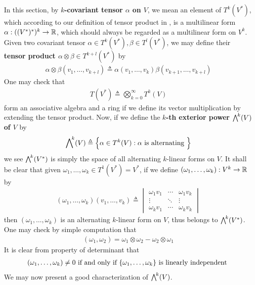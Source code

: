 \documentclass{report}
\begin{document}
\begin{mdframed}
  In this section, by \textbf{$k$-covariant tensor $\alpha $ on $V$}, we mean an element of $T^k(V^*)$, which according to our definition of tensor product in , is a multilinear form $\alpha : ((V^*)^*)^k\rightarrow \mathbb{R}$, which should always be regarded as a multilinear form on $V^k$. Given two covariant tensor $\alpha \in T^k(V^*),\beta \in T^l(V^*)$, we may define their \textbf{tensor product $\alpha \otimes  \beta \in T^{k+l}(V^*)$} by 
\begin{align*}
\alpha \otimes  \beta (v_1,\dots ,v_{k+l})\triangleq \alpha (v_1,\dots ,v_k)\beta (v_{k+1},\dots ,v_{k+l})
\end{align*}
One may check that 
\begin{align*}
T(V^*)\triangleq  \bigotimes_{k=0}^{\infty} T^k(V)
\end{align*}
form an associative algebra and a ring if we define its vector multiplication by extending the tensor product. Now, if we define the  \textbf{$k$-th exterior power $\extp^k(V)$ of $V$} by
\begin{align*}
\extp^k(V)\triangleq \bset{\alpha \in T^k(V):\alpha \text{ is alternating }}
\end{align*}
we see $\extp^k(V^*)$ is simply the space of all alternating $k$-linear forms on  $V$. It shall be clear that given $\omega_1,\dots ,\omega_k \in T^1(V^*)=V^*$, if we define $(\omega_1,\dots ,\omega_k):V^k\rightarrow \mathbb{R}$ by 
\begin{align*}
  (\omega_1,\dots ,\omega_k)(v_1,\dots ,v_k)\triangleq  \begin{vmatrix}
      \omega_1 v_1 & \cdots & \omega_1 v_k \\
      \vdots & \ddots & \vdots \\
      \omega_k v_1 & \cdots & \omega_k v_k
  \end{vmatrix} 
\end{align*}
then $(\omega_1,\dots ,\omega_k)$ is an alternating $k$-linear form on $V$, thus belongs to $\extp^k(V^*) $. One may check by simple computation that 
\begin{align*}
  (\omega_1,\omega_2)=\omega_1 \otimes \omega_2- \omega_2 \otimes  \omega_1
\end{align*}
It is clear from property of determinant that 
\begin{align*}
  (\omega_1,\dots ,\omega_k)\neq 0\text{ if and only if }\{ \omega_1,\dots ,\omega_k \}\text{ is linearly independent }
\end{align*}
We may now present a good characterization of $\extp^k(V)$. 
\end{mdframed}
\end{document}
